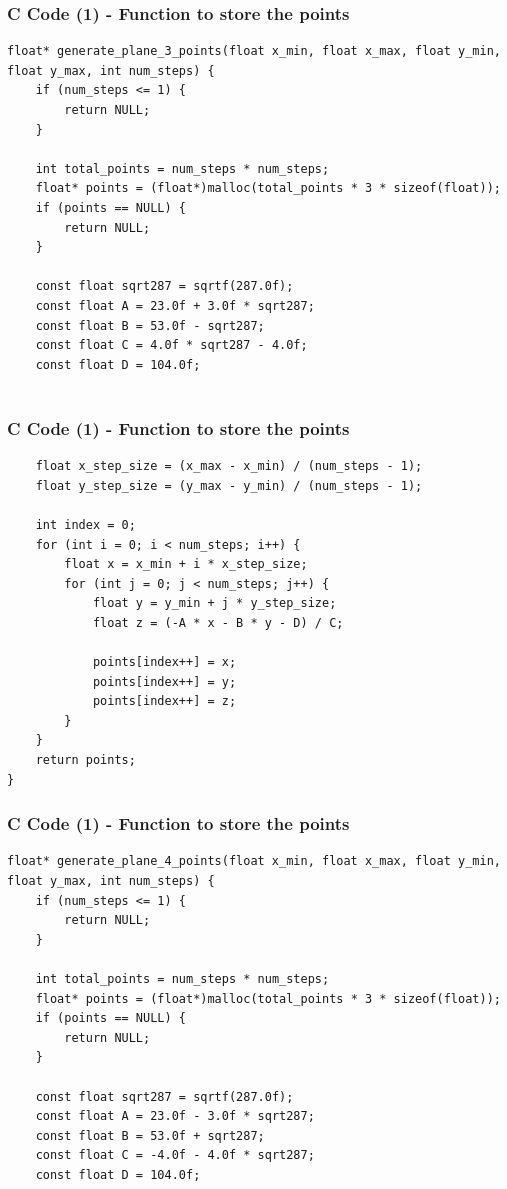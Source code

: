 \documentclass{beamer}
\begin{document}
\begin{frame}[fragile]
    \frametitle{C Code (1) - Function to store the points }

    \begin{lstlisting}
float* generate_plane_3_points(float x_min, float x_max, float y_min, float y_max, int num_steps) {
    if (num_steps <= 1) {
        return NULL;
    }

    int total_points = num_steps * num_steps;
    float* points = (float*)malloc(total_points * 3 * sizeof(float));
    if (points == NULL) {
        return NULL;
    }
    
    const float sqrt287 = sqrtf(287.0f);
    const float A = 23.0f + 3.0f * sqrt287;
    const float B = 53.0f - sqrt287;
    const float C = 4.0f * sqrt287 - 4.0f;
    const float D = 104.0f;


    \end{lstlisting}
\end{frame}
\begin{frame}[fragile]
    \frametitle{C Code (1) - Function to store the points }

    \begin{lstlisting}
    float x_step_size = (x_max - x_min) / (num_steps - 1);
    float y_step_size = (y_max - y_min) / (num_steps - 1);

    int index = 0;
    for (int i = 0; i < num_steps; i++) {
        float x = x_min + i * x_step_size;
        for (int j = 0; j < num_steps; j++) {
            float y = y_min + j * y_step_size;
            float z = (-A * x - B * y - D) / C;

            points[index++] = x;
            points[index++] = y;
            points[index++] = z;
        }
    }
    return points;
}
    \end{lstlisting}
\end{frame}
\begin{frame}[fragile]
    \frametitle{C Code (1) - Function to store the points }

    \begin{lstlisting}
float* generate_plane_4_points(float x_min, float x_max, float y_min, float y_max, int num_steps) {
    if (num_steps <= 1) {
        return NULL;
    }

    int total_points = num_steps * num_steps;
    float* points = (float*)malloc(total_points * 3 * sizeof(float));
    if (points == NULL) {
        return NULL;
    }

    const float sqrt287 = sqrtf(287.0f);
    const float A = 23.0f - 3.0f * sqrt287;
    const float B = 53.0f + sqrt287;
    const float C = -4.0f - 4.0f * sqrt287;
    const float D = 104.0f;


    \end{lstlisting}
\end{frame}
\end{document}
